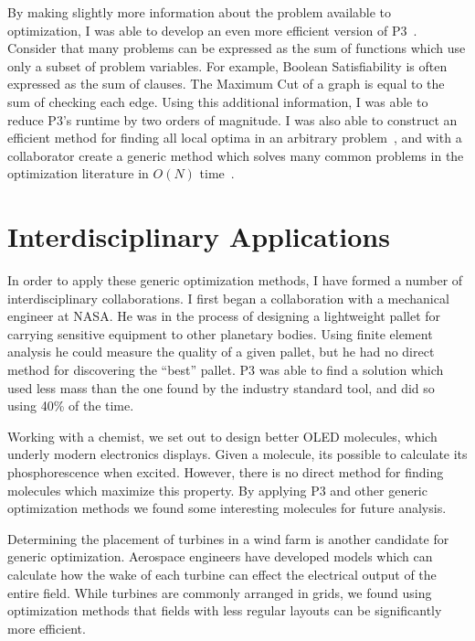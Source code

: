 \documentclass[a4paper, 11pt]{article}
\begin{document}
By making slightly more information about the problem available to optimization, I was
able to develop an even more efficient version of P3~\cite{goldman:2015:GBO}. Consider
that many problems can be expressed as the sum of functions which use only a subset
of problem variables. For example, Boolean Satisfiability is often expressed as the sum
of clauses. The Maximum Cut of a graph is equal to the sum of checking each edge.
Using this additional information, I was able to reduce P3's runtime by two
orders of magnitude. I was also able to construct an efficient method
for finding all local optima in an arbitrary problem~\cite{goldman:2016:hyperplane},
and with a collaborator create a generic method which solves many common
problems in the optimization literature in $O(N)$ time~\cite{whitley:2016:mkl}.

\section{Interdisciplinary Applications}
In order to apply these generic optimization methods, I have formed a number of
interdisciplinary collaborations. I first began a collaboration with a mechanical engineer
at NASA. He was in the process of designing a lightweight pallet for carrying sensitive
equipment to other planetary bodies. Using finite element analysis he could measure
the quality of a given pallet, but he had no direct method for discovering the ``best'' pallet.
P3 was able to find a solution which used less mass than the one found by the industry standard
tool, and did so using 40\% of the time.


Working with a chemist, we set out to
design better OLED molecules, which underly modern electronics displays.
Given a molecule, its possible to calculate its phosphorescence when excited. However,
there is no direct method for finding molecules which maximize this property.
By applying P3 and other generic optimization methods we found some interesting
molecules for future analysis.

Determining the placement of turbines in a wind farm is another candidate for
generic optimization. Aerospace engineers have developed models which can calculate
how the wake of each turbine can effect the electrical output of the entire field.
While turbines are commonly arranged in grids, we found using optimization methods
that fields with less regular layouts can be significantly more efficient.
\end{document}

